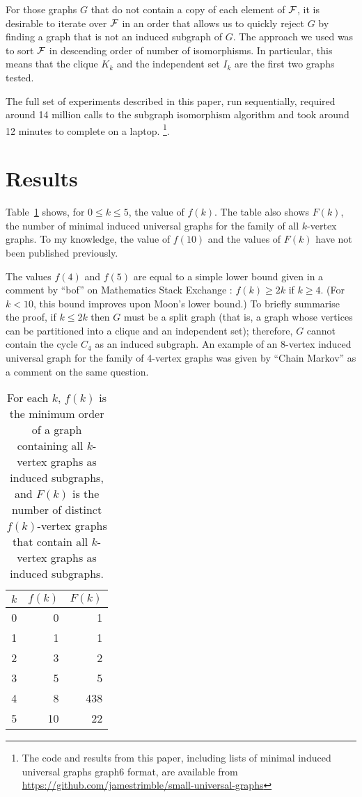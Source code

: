 \documentclass[12pt]{article}
\begin{document}
For those graphs $G$ that do not contain a copy of each element of $\mathcal{F}$, it
is desirable to iterate over $\mathcal{F}$ in an order that allows us to quickly
reject $G$ by finding a graph that is not an induced subgraph of $G$.  The approach we
used was to sort $\mathcal{F}$ in descending order of number of isomorphisms.  In
particular, this means that the clique $K_k$ and the independent set $I_k$ are
the first two graphs tested.

The full set of experiments described in this paper, run sequentially, required
around 14 million calls to the subgraph isomorphism algorithm and took around
12 minutes to complete on a laptop.  \footnote{The code and results from this
paper, including lists of minimal induced universal graphs graph6 format, are
available from \url{https://github.com/jamestrimble/small-universal-graphs}}.

\section{Results}

Table~\ref{tab:graphresults} shows, for $0 \leq k \leq 5$, the value of $f(k)$.
The table also shows $F(k)$, the number of minimal induced universal
graphs for the family of all $k$-vertex graphs.  To my knowledge, the value of
$f(10)$ and the values of $F(k)$ have not been published previously.

The values $f(4)$ and $f(5)$ are equal to a simple lower bound
given in a comment by ``bof'' on Mathematics Stack Exchange
\cite{math_se_question}: $f(k) \geq 2k$ if $k \geq 4$.  (For $k < 10$, this
bound improves upon Moon's lower bound.)  To briefly summarise the proof, if $k \leq 2k$
then $G$ must be a split graph (that is, a graph whose vertices can be
partitioned into a clique and an independent set); therefore, $G$ cannot
contain the cycle $C_4$ as an induced subgraph.  An example of an 8-vertex
induced universal graph for the family of 4-vertex graphs was given by ``Chain
Markov'' as a comment on the same question.

\begin{table}[h!]
\centering
\begin{tabular}{r r r}
 \toprule
 $k$ & $f(k)$ & $F(k)$ \\ [0.5ex]
 \midrule
 0 & 0 & 1 \\
 1 & 1 & 1 \\
 2 & 3 & 2 \\
 3 & 5 & 5 \\
 4 & 8 & 438 \\
 5 & 10 & 22 \\
 \bottomrule
\end{tabular}
\caption{For each $k$, $f(k)$ is the minimum order of a graph containing all $k$-vertex graphs as
induced subgraphs, and $F(k)$ is the number of distinct $f(k)$-vertex graphs that contain
all $k$-vertex graphs as induced subgraphs.}
\label{tab:graphresults}
\end{table}
%
%
\end{document}
